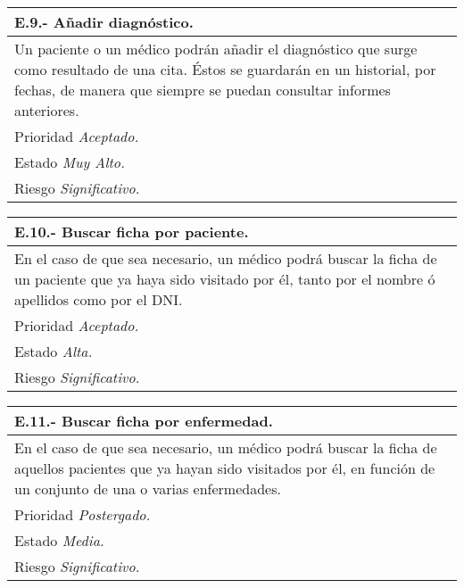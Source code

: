 	\begin{center}
	\begin{tabulary}{15cm}{|L|}
		\hline
			\bf{E.9.- Añadir diagnóstico.} \\
		\hline
			Un paciente o un médico podrán añadir el diagnóstico que surge como resultado de una cita. Éstos se guardarán en un historial, por fechas, de manera que siempre se puedan consultar informes anteriores. \\
		\hline
			Prioridad \textit{Aceptado.} \\
		\hline
			Estado \textit{Muy Alto.} \\
		\hline
			Riesgo \textit{Significativo.} \\
		\hline
	\end{tabulary}
	\end{center}

	\begin{center}
	\begin{tabulary}{15cm}{|L|}
		\hline
			\bf{E.10.- Buscar ficha por paciente.} \\
		\hline
			En el caso de que sea necesario, un médico podrá buscar la ficha de un paciente que ya haya sido visitado por él, tanto por el nombre ó apellidos como por el DNI. \\
		\hline
			Prioridad \textit{Aceptado.} \\
		\hline
			Estado \textit{Alta.} \\
		\hline
			Riesgo \textit{Significativo.} \\
		\hline
	\end{tabulary}
	\end{center}

	\begin{center}
	\begin{tabulary}{15cm}{|L|}
		\hline
			\bf{E.11.- Buscar ficha por enfermedad.} \\
		\hline
			En el caso de que sea necesario, un médico podrá buscar la ficha de aquellos pacientes que ya hayan sido visitados por él, en función de un conjunto de una o varias enfermedades. \\
		\hline
			Prioridad \textit{Postergado.} \\
		\hline
			Estado \textit{Media.} \\
		\hline
			Riesgo \textit{Significativo.} \\
		\hline
	\end{tabulary}
	\end{center}


